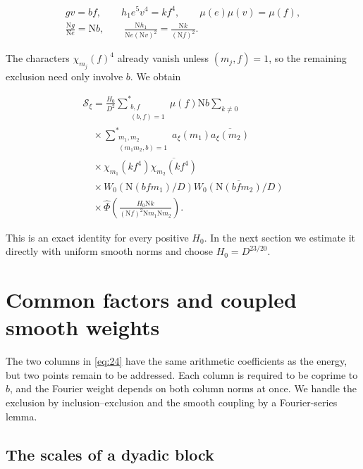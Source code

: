 \documentclass[reqno,a4paper,11pt]{amsart}
\begin{document}
\begin{equation}\label{eq:change-identities}
\begin{gathered}
gv=bf,\qquad h_1e^5v^4=kf^4,\qquad\mu(e)\mu(v)=\mu(f), \\ \frac{\mathrm{N}g}{\mathrm{N}e}=\mathrm{N}b,\qquad\frac{\mathrm{N}h_1}{\mathrm{N}e(\mathrm{N}v)^2}=\frac{\mathrm{N}k}{(\mathrm{N}f)^2}.
\end{gathered}
\end{equation}

The characters $\chi_{m_j}(f)^4$ already vanish unless $(m_j,f)=1$, so the remaining exclusion need only involve $b$. We obtain

\begin{equation}\label{eq:24}
\begin{gathered}
\mathcal{S}_\xi=\frac{H_0}{D^2}\sum_{\substack{b,f\\(b,f)=1}}^*\mu(f)\mathrm{N}b\sum_{k\ne0} \\ \quad\times\sum_{\substack{m_1,m_2\\(m_1m_2,b)=1}}^*a_\xi(m_1)\overline{a_\xi(m_2)} \\ \quad\times\chi_{m_1}(kf^4)\overline{\chi_{m_2}(kf^4)} \\ \quad\times W_0(\mathrm{N}(bfm_1)/D)\overline{W_0(\mathrm{N}(bfm_2)/D)} \\ \quad\times\widehat{\Phi}\left(\frac{H_0\mathrm{N}k}{(\mathrm{N}f)^2\mathrm{N}m_1\mathrm{N}m_2}\right).
\end{gathered}
\end{equation}

This is an exact identity for every positive $H_0$. In the next section we estimate it directly with uniform smooth norms and choose $H_0=D^{23/20}$.

\section{Common factors and coupled smooth weights}

The two columns in \eqref{eq:24} have the same arithmetic coefficients as the energy, but two points remain to be addressed. Each column is required to be coprime to $b$, and the Fourier weight depends on both column norms at once. We handle the exclusion by inclusion--exclusion and the smooth coupling by a Fourier-series lemma.

\subsection*{The scales of a dyadic block}
\end{document}
